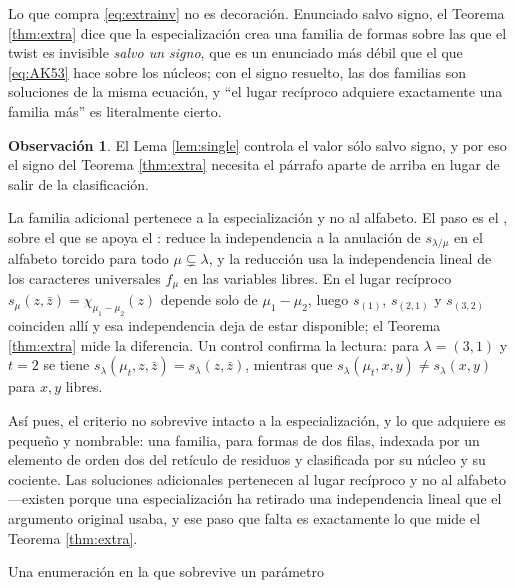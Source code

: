 \documentclass[11pt,reqno]{amsart}
\makeatletter
\renewcommand\section{\@startsection{section}{1}%
  \z@{\linespacing\@plus\linespacing}{.5\linespacing}%
  {\normalfont\large\bfseries\centering}}
\theoremstyle{plain}
\theoremstyle{definition}
\newtheorem{remark}[theorem]{Observación}
\newcommand{\zt}{\mu_t}
\newcommand{\zb}{\bar z}
\makeatother
\begin{document}
\noindent Lo que compra \eqref{eq:extrainv} no es decoración. Enunciado salvo signo, el Teorema
\ref{thm:extra} dice que la especialización crea una familia de formas sobre las que el twist es
invisible \emph{salvo un signo}, que es un enunciado más débil que el que \eqref{eq:AK53} hace sobre
los núcleos; con el signo resuelto, las dos familias son soluciones de la misma ecuación, y ``el
lugar recíproco adquiere exactamente una familia más'' es literalmente cierto.

\begin{remark}\label{rem:why}
El Lema \ref{lem:single} controla el valor sólo salvo signo, y por eso el signo del Teorema
\ref{thm:extra} necesita el párrafo aparte de arriba en lugar de salir de la clasificación.

La familia adicional pertenece a la especialización y no al alfabeto. El paso es el
\cite[Lema 5.2]{AK25}, sobre el que se apoya el \cite[Teorema 5.3]{AK25}: reduce la independencia a
la anulación de $s_{\lambda/\mu}$ en el alfabeto torcido para todo $\mu\subsetneq\lambda$, y la
reducción usa la independencia lineal de los caracteres universales $f_\mu$ en las variables libres. En el lugar recíproco
$s_\mu(z,\zb)=\chi_{\mu_1-\mu_2}(z)$ depende solo de $\mu_1-\mu_2$, luego $s_{(1)}$, $s_{(2,1)}$ y
$s_{(3,2)}$ coinciden allí y esa independencia deja de estar disponible; el Teorema \ref{thm:extra}
mide la diferencia. Un control confirma la lectura: para $\lambda=(3,1)$ y $t=2$ se tiene
$s_\lambda(\zt,z,\zb)=s_\lambda(z,\zb)$, mientras que $s_\lambda(\zt,x,y)\ne s_\lambda(x,y)$ para
$x,y$ libres.
\end{remark}

Así pues, el criterio no sobrevive intacto a la especialización, y lo que adquiere es pequeño y
nombrable: una familia, para formas de dos filas, indexada por un elemento de orden dos del retículo
de residuos y clasificada por su núcleo y su cociente. Las soluciones adicionales pertenecen al lugar
recíproco y no al alfabeto ---existen porque una especialización ha retirado una independencia lineal
que el argumento original usaba, y ese paso que falta es exactamente lo que mide el Teorema
\ref{thm:extra}.

\section{Una enumeración en la que sobrevive un parámetro}\label{sec:enum}
\end{document}
